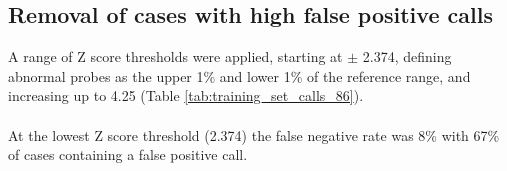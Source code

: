 \begin{table}[]
\centering
\caption{A very high number of false positive calls was seen in the 86 training cases using a range of Z score thresholds.}
\label{tab:training_set_calls_86}
\end{table}


\subsection{Removal of cases with high false positive calls}
A range of Z score thresholds were applied, starting at $\pm  $ 2.374,  defining abnormal probes as the upper 1\% and lower 1\% of the reference range, and increasing up to 4.25 (Table \ref{tab:training_set_calls_86}).
\paragraph*{}
At the lowest Z score threshold (2.374) the false negative rate was 8\% with 67\% of cases containing a false positive call.
